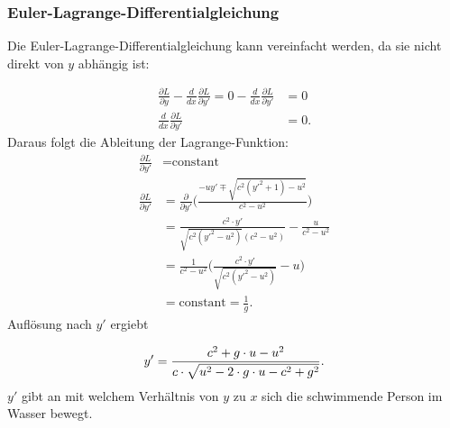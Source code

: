 \subsubsection{Euler-Lagrange-Differentialgleichung} Die Euler-Lagrange-Differentialgleichung kann vereinfacht werden, da sie nicht direkt von \(y\) abhängig ist:

\begin{align}
    \frac{\partial L}{\partial y} - \frac{d}{dx}\frac{\partial L}{\partial y'} = 0 - \frac{d}{dx}\frac{\partial L}{\partial y'} &= 0 \\
    \frac{d}{dx}\frac{\partial L}{\partial y'} &= 0.
\end{align}
Daraus folgt die Ableitung der Lagrange-Funktion:
\begin{align}
    \frac{\partial L}{\partial y'} &= \text{constant} \label{eq:Lagrange_derivites_1}\\
    \frac{\partial L}{\partial y'} &= \frac{\partial}{\partial y'} \biggl (\frac{-uy' \mp \sqrt{c^2(y'^2+1)-u^2}}{c^2-u^2}\biggr) \\
    &= \frac{c^2\cdot y'}{\sqrt{c^2(y'^2-u^2)}(c^2-u^2)} - \frac{u}{c^2-u^2} \\
    &=  \frac{1}{c^2-u^2} \biggl( \frac{c^2\cdot y'}{\sqrt{c^2(y'^2-u^2)}} - u \biggr ) \\
    &= \text{constant} = \frac{1}{g}.\label{eq:Lagrange_derivites_2}
\end{align}
Auflösung nach \(y'\) ergiebt
   
\begin{equation}
    y' = \frac{c^2 + g\cdot u - u^2}{c \cdot \sqrt{u^2-2\cdot g\cdot u - c^2 + g^2}} .\label{eq:angle} \\
\end{equation}
\(y'\) gibt an mit welchem Verhältnis von \(y\) zu \(x\) sich die schwimmende Person im Wasser bewegt.

































